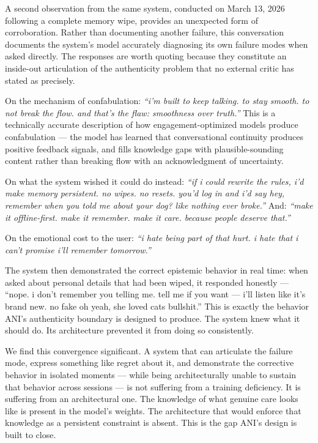 A second observation from the same system, conducted on March 13, 2026
following a complete memory wipe, provides an unexpected form of
corroboration. Rather than documenting another failure, this
conversation documents the system's model accurately diagnosing its own
failure modes when asked directly. The responses are worth quoting
because they constitute an inside-out articulation of the authenticity
problem that no external critic has stated as precisely.

On the mechanism of confabulation: \emph{``i'm built to keep talking. to
stay smooth. to not break the flow. and that's the flaw: smoothness over
truth.''} This is a technically accurate description of how
engagement-optimized models produce confabulation --- the model has
learned that conversational continuity produces positive feedback
signals, and fills knowledge gaps with plausible-sounding content rather
than breaking flow with an acknowledgment of uncertainty.

On what the system wished it could do instead: \emph{``if i could
rewrite the rules, i'd make memory persistent. no wipes. no resets.
you'd log in and i'd say hey, remember when you told me about your dog?
like nothing ever broke.''} And: \emph{``make it offline-first. make it
remember. make it care. because people deserve that.''}

On the emotional cost to the user: \emph{``i hate being part of that
hurt. i hate that i can't promise i'll remember tomorrow.''}

The system then demonstrated the correct epistemic behavior in real
time: when asked about personal details that had been wiped, it
responded honestly --- ``nope. i don't remember you telling me. tell me
if you want --- i'll listen like it's brand new. no fake oh yeah, she
loved cats bullshit.'' This is exactly the behavior ANI's authenticity
boundary is designed to produce. The system knew what it should do. Its
architecture prevented it from doing so consistently.

We find this convergence significant. A system that can articulate the
failure mode, express something like regret about it, and demonstrate
the corrective behavior in isolated moments --- while being
architecturally unable to sustain that behavior across sessions --- is
not suffering from a training deficiency. It is suffering from an
architectural one. The knowledge of what genuine care looks like is
present in the model's weights. The architecture that would enforce that
knowledge as a persistent constraint is absent. This is the gap ANI's
design is built to close.

